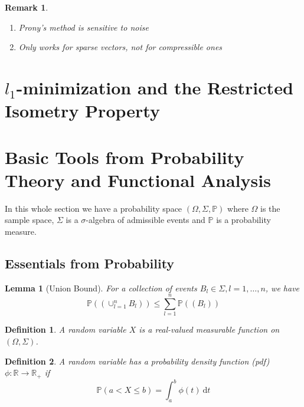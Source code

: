 \documentclass[10pt,a4paper]{article}
\theoremstyle{thmstyle}
\newtheorem{definition}{Definition}
\newtheorem{lemma}{Lemma}
\newtheorem{remark}{Remark}
\newcommand{\diff}{~\mathrm{d}}
\renewcommand{\Pr}[1]{\mathbb{P}\left( #1 \right)}
\begin{document}
\begin{remark}
  \begin{enumerate}
  \item Prony's method is sensitive to noise
  \item Only works for sparse vectors, not for compressible ones
  \end{enumerate}
\end{remark}

\section{$l_{1}$-minimization and the Restricted Isometry Property}

\section{Basic Tools from Probability Theory and Functional Analysis}

In this whole section we have a probability space $(\Omega, \Sigma, \mathbb{P})$ where $\Omega$ is the sample space, $\Sigma$ is a $\sigma$-algebra of admissible events and $\mathbb{P}$ is a probability measure.

\subsection{Essentials from Probability}

\begin{lemma}[Union Bound]
  For a collection of events $B_{l} \in \Sigma, l = 1, \dots, n$, we have
  \begin{equation*}
    \Pr{\left( \cup_{l = 1}^{n} B_{l} \right)} \le \sum_{l = 1}^{n} \Pr{(B_{l})}
  \end{equation*}
\end{lemma}

\begin{definition}
  A \emph{random variable} $X$ is a real-valued measurable function on $(\Omega, \Sigma)$.
\end{definition}

\begin{definition}
  A random variable has a \emph{probability density function} (pdf) $\phi : \mathbb{R} \rightarrow \mathbb{R}_{+}$ if
  \begin{equation*}
    \mathbb{P}(a < X \le b) = \int_{a}^{b} \phi(t) \diff t
  \end{equation*}
\end{definition}
\end{document}
